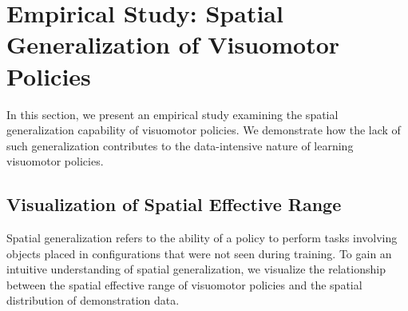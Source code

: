 





\section{Empirical Study: Spatial Generalization of Visuomotor Policies}
\label{sec:empirical}


In this section, we present an empirical study examining the spatial generalization capability of visuomotor policies. We demonstrate how the lack of such generalization contributes to the data-intensive nature of learning visuomotor policies.



\subsection{Visualization of Spatial Effective Range}

Spatial generalization refers to the ability of a policy to perform tasks involving objects placed in configurations that were not seen during training. To gain an intuitive understanding of spatial generalization, we visualize the relationship between the spatial effective range of visuomotor policies and the spatial distribution of demonstration data.

